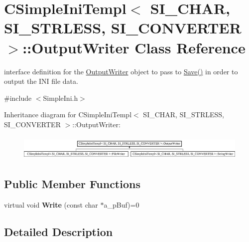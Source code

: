 \hypertarget{class_c_simple_ini_templ_1_1_output_writer}{}\section{C\+Simple\+Ini\+Templ$<$ S\+I\+\_\+\+C\+H\+AR, S\+I\+\_\+\+S\+T\+R\+L\+E\+SS, S\+I\+\_\+\+C\+O\+N\+V\+E\+R\+T\+ER $>$\+:\+:Output\+Writer Class Reference}
\label{class_c_simple_ini_templ_1_1_output_writer}


interface definition for the \hyperlink{class_c_simple_ini_templ_1_1_output_writer}{Output\+Writer} object to pass to \hyperlink{class_c_simple_ini_templ_a5fea5d590edbb5eef694991c7c355915}{Save()} in order to output the I\+NI file data.  




{\ttfamily \#include $<$Simple\+Ini.\+h$>$}

Inheritance diagram for C\+Simple\+Ini\+Templ$<$ S\+I\+\_\+\+C\+H\+AR, S\+I\+\_\+\+S\+T\+R\+L\+E\+SS, S\+I\+\_\+\+C\+O\+N\+V\+E\+R\+T\+ER $>$\+:\+:Output\+Writer\+:\begin{figure}[H]
\begin{center}
\leavevmode
\includegraphics[height=1.244444cm]{class_c_simple_ini_templ_1_1_output_writer}
\end{center}
\end{figure}
\subsection*{Public Member Functions}
\begin{DoxyCompactItemize}
\item 
virtual void {\bfseries Write} (const char $\ast$a\+\_\+p\+Buf)=0\hypertarget{class_c_simple_ini_templ_1_1_output_writer_a48e5905a9defbe96d14f3068a383463d}{}\label{class_c_simple_ini_templ_1_1_output_writer_a48e5905a9defbe96d14f3068a383463d}

\end{DoxyCompactItemize}


\subsection{Detailed Description}

